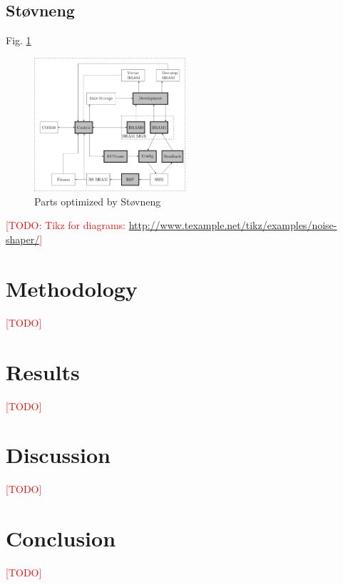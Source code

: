 \documentclass[a4paper]{IEEEtran}
\newcommand\TODO{\textcolor{red}{[TODO]}}
\newcommand\todo[1]{\textcolor{red}{[TODO: #1]}}
\begin{document}
\subsection{Støvneng \cite{stovneng2014sblock}}

Fig. \ref{fig:ca-stovneng}

\begin{figure}[h!]
    \centering
    \includegraphics[width=0.5\textwidth]{figures/ca-stovneng}
    \caption{Parts optimized by Støvneng}
    \label{fig:ca-stovneng}
\end{figure}

\todo{Tikz for diagrams: \url{http://www.texample.net/tikz/examples/noise-shaper/}}

\section{Methodology}

\TODO

\section{Results}

\TODO

\section{Discussion}

\TODO

\section{Conclusion}

\TODO



\end{document}
